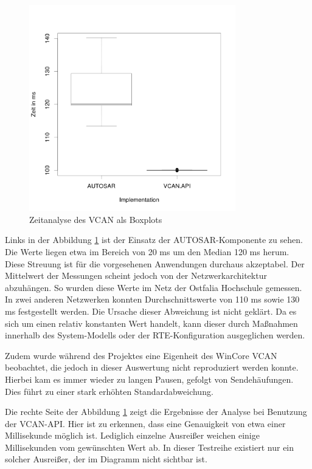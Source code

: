 \documentclass[
  a4paper,					    %
  twoside,
  DIV=calc,     				%
  bibliography=totoc,
  cleardoublepage=empty,
  ngerman,     					%
  final       					%
]{scrbook}
\begin{document}
\begin{figure}[tb]
    \centering
    \includegraphics[width=0.8\textwidth]{boxplot}
    \caption[Zeitanalyse des VCAN als Boxplots]{Zeitanalyse des VCAN als Boxplots}
    \label{fig:timinganalyse}
\end{figure}

Links in der Abbildung \ref{fig:timinganalyse} ist der Einsatz der AUTOSAR-Komponente zu sehen. Die Werte liegen etwa im Bereich von 20 ms um den Median 120 ms herum. Diese Streuung ist für die vorgesehenen Anwendungen durchaus akzeptabel. Der Mittelwert der Messungen scheint jedoch von der Netzwerkarchitektur abzuhängen. So wurden diese Werte im Netz der Ostfalia Hochschule gemessen. In zwei anderen Netzwerken konnten Durchschnittswerte von 110 ms sowie 130 ms festgestellt werden. Die Ursache dieser Abweichung ist nicht geklärt. Da es sich um einen relativ konstanten Wert handelt, kann dieser durch Maßnahmen innerhalb des System-Modells oder der RTE-Konfiguration ausgeglichen werden.

Zudem wurde während des Projektes eine Eigenheit des WinCore VCAN beobachtet, die jedoch in dieser Auswertung nicht reproduziert werden konnte. Hierbei kam es immer wieder zu langen Pausen, gefolgt von Sendehäufungen. Dies führt zu einer stark erhöhten Standardabweichung.

Die rechte Seite der Abbildung \ref{fig:timinganalyse} zeigt die Ergebnisse der Analyse bei Benutzung der VCAN-API. Hier ist zu erkennen, dass eine Genauigkeit von etwa einer Millisekunde möglich ist. Lediglich einzelne Ausreißer weichen einige Millisekunden vom gewünschten Wert ab. In dieser Testreihe existiert nur ein solcher Ausreißer, der im Diagramm nicht sichtbar ist.
\end{document}
